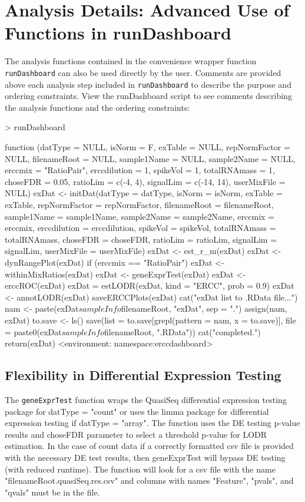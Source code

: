 \documentclass{article}
\begin{document}
\section{Analysis Details: Advanced Use of Functions in runDashboard}
The analysis functions contained in the convenience wrapper function 
\verb|runDashboard| can also be used directly by the user.
Comments are provided above each analysis step included in \verb|runDashboard| to
describe the purpose and ordering constraints.
View the runDashboard script to see comments describing the analysis functions and the ordering constraints:
\begin{Schunk}
\begin{Sinput}
> runDashboard
\end{Sinput}
\begin{Soutput}
function (datType = NULL, isNorm = F, exTable = NULL, repNormFactor = NULL, 
    filenameRoot = NULL, sample1Name = NULL, sample2Name = NULL, 
    erccmix = "RatioPair", erccdilution = 1, spikeVol = 1, totalRNAmass = 1, 
    choseFDR = 0.05, ratioLim = c(-4, 4), signalLim = c(-14, 
        14), userMixFile = NULL) 
{
    exDat <- initDat(datType = datType, isNorm = isNorm, exTable = exTable, 
        repNormFactor = repNormFactor, filenameRoot = filenameRoot, 
        sample1Name = sample1Name, sample2Name = sample2Name, 
        erccmix = erccmix, erccdilution = erccdilution, spikeVol = spikeVol, 
        totalRNAmass = totalRNAmass, choseFDR = choseFDR, ratioLim = ratioLim, 
        signalLim = signalLim, userMixFile = userMixFile)
    exDat <- est_r_m(exDat)
    exDat <- dynRangePlot(exDat)
    if (erccmix == "RatioPair") {
        exDat <- withinMixRatios(exDat)
    }
    exDat <- geneExprTest(exDat)
    exDat <- erccROC(exDat)
    exDat = estLODR(exDat, kind = "ERCC", prob = 0.9)
    exDat <- annotLODR(exDat)
    saveERCCPlots(exDat)
    cat("\nSaving exDat list to .RData file...")
    nam <- paste(exDat$sampleInfo$filenameRoot, "exDat", sep = ".")
    assign(nam, exDat)
    to.save <- ls()
    save(list = to.save[grepl(pattern = nam, x = to.save)], file = paste0(exDat$sampleInfo$filenameRoot, 
        ".RData"))
    cat("\nAnalysis completed.")
    return(exDat)
}
<environment: namespace:erccdashboard>
\end{Soutput}
\end{Schunk}

\subsection{Flexibility in Differential Expression Testing}
The \verb|geneExprTest| function wraps the QuasiSeq differential expression 
testing package for datType = "count" or uses the limma package for differential
expression testing if datType = "array". The function uses the DE testing 
p-value results and choseFDR parameter to select a threshold p-value for LODR 
estimation.
In the case of count data if a correctly formatted csv file is provided with the
necessary DE test results, then geneExprTest will bypass DE testing (with 
reduced runtime). The function will look for a csv file with the name 
"filenameRoot.quasiSeq.res.csv" and columns with names "Feature", "pvals", and 
"qvals" must be in the file.
\end{document}
